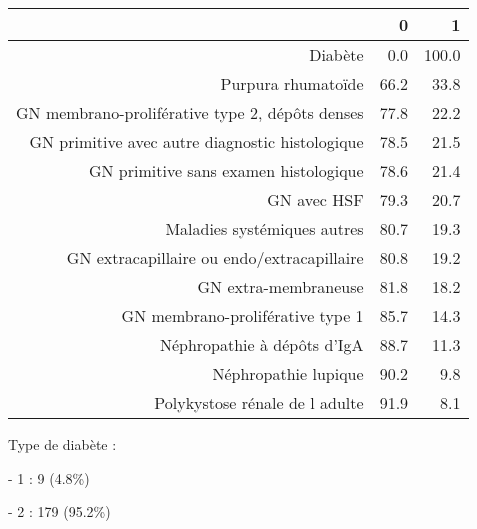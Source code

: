 \documentclass[11pt,a4paper]{article}\usepackage[]{graphicx}\usepackage[]{color}
\begin{document}
\begin{table}[H]
\centering
\begin{tabular}{rrr}
  \hline
 & 0 & 1 \\ 
  \hline
Diabète & 0.0 & 100.0 \\ 
  Purpura rhumatoïde & 66.2 & 33.8 \\ 
  GN membrano-proliférative type 2, dépôts denses & 77.8 & 22.2 \\ 
  GN primitive avec autre diagnostic histologique & 78.5 & 21.5 \\ 
  GN primitive sans examen histologique & 78.6 & 21.4 \\ 
  GN avec HSF & 79.3 & 20.7 \\ 
  Maladies systémiques autres & 80.7 & 19.3 \\ 
  GN extracapillaire ou endo/extracapillaire & 80.8 & 19.2 \\ 
  GN extra-membraneuse & 81.8 & 18.2 \\ 
  GN membrano-proliférative type 1 & 85.7 & 14.3 \\ 
  Néphropathie à dépôts d'IgA & 88.7 & 11.3 \\ 
  Néphropathie lupique & 90.2 & 9.8 \\ 
  Polykystose rénale de l adulte & 91.9 & 8.1 \\ 
   \hline
\end{tabular}
\end{table}


Type de diabète : 

- 1 : 9 (4.8\%)

- 2 : 179 (95.2\%)
\end{document}
